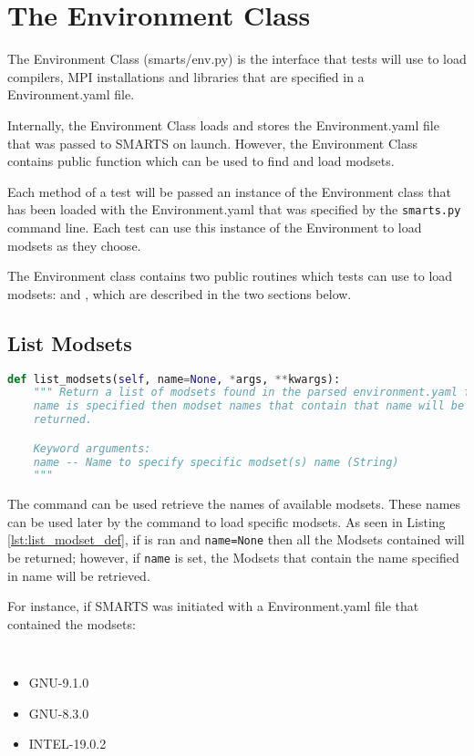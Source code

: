 \chapter{The Environment Class}
\label{chap:environment_class}

The Environment Class (smarts/env.py) is the interface that tests will use to
load compilers, MPI installations and libraries that are specified in a
Environment.yaml file. 

Internally, the Environment Class loads and stores the Environment.yaml file
that was passed to SMARTS on launch. However, the Environment Class contains
public function which can be used to find and load modsets.

Each \testRun method of a test will be passed an instance of the Environment
class that has been loaded with the Environment.yaml that was specified by the
{\tt smarts.py} command line. Each test can use this instance of the
Environment to load modsets as they choose.

The Environment class contains two public routines which tests can use to load
modsets: \listModsets and \loadModset, which are described in the two sections
below.

\section{List Modsets}
\label{sec:list-modsets}

\begin{lstlisting}[language=Python, 
                   caption={list\_modset Definition},
                   label={lst:list_modset_def}]
def list_modsets(self, name=None, *args, **kwargs):
    """ Return a list of modsets found in the parsed environment.yaml file, if
    name is specified then modset names that contain that name will be
    returned.

    Keyword arguments:
    name -- Name to specify specific modset(s) name (String)
    """
\end{lstlisting}

The \listModsets command can be used retrieve the names of available modsets.
These names can be used later by the \loadModset command to load specific
modsets. As seen in Listing \ref{lst:list_modset_def}, if \listModsets is ran
and {\tt name=None} then all the Modsets contained will be returned; however,
if {\tt name} is set, the Modsets that contain the name specified in name will
be retrieved.

For instance, if SMARTS was initiated with a Environment.yaml file that
contained the modsets:
{\tt
\begin{itemize}
\item GNU-9.1.0
\item GNU-8.3.0
\item INTEL-19.0.2
\end{itemize}
}


